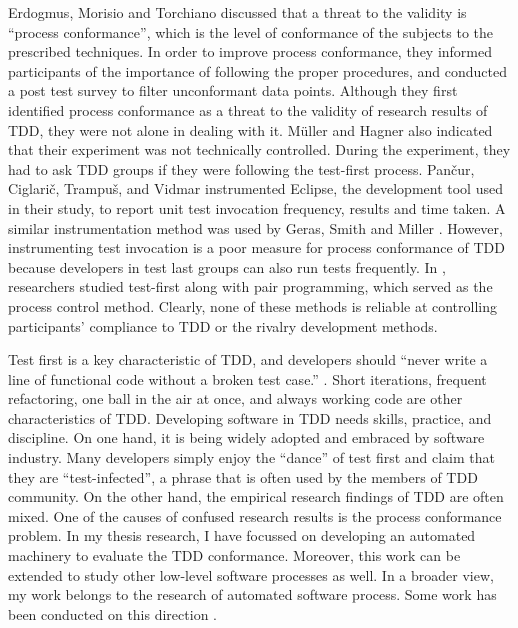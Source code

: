 Erdogmus, Morisio and Torchiano \cite{Erdogmus:05} discussed that
a threat to the validity is ``process conformance'',
which is the level of conformance of the subjects
to the prescribed techniques. In order to improve process conformance,
they informed participants of the importance of following the 
proper procedures, and conducted a post test survey to filter 
unconformant data points\cite{Erdogmus:05}. Although they first
identified process conformance as a threat to the validity 
of research results of TDD, they were not alone in 
dealing with it. M\"uller and Hagner \cite{Muller:02} also 
indicated that their experiment was not technically controlled. 
During the experiment, they had to ask TDD groups if they were
following the test-first process. Pan\v{c}ur, Ciglari\v{c}, 
Trampu\v{s}, and Vidmar \cite{Matjaz:03} instrumented Eclipse, 
the development tool used in their study, to report unit test 
invocation frequency, results and time taken. A similar 
instrumentation method was used by Geras, Smith and Miller 
\cite{Geras:04}. However, instrumenting test invocation is 
a poor measure for process conformance of TDD because developers 
in test last groups can also run tests frequently. In 
\cite{George:03,Williams:03,Maximilien:03}, researchers studied 
test-first along with pair programming, which served as the 
process control method. Clearly, none of these methods is 
reliable at controlling participants' compliance to TDD or 
the rivalry development methods. 

Test first is a key characteristic of TDD, and developers 
should ``never write a line of functional code without a broken 
test case.'' \cite{Beck:01}. Short iterations, frequent 
refactoring, one ball in the air at once, and always working 
code are other characteristics of TDD. Developing software in 
TDD needs skills, practice, and discipline. On one hand, it is 
being widely adopted and embraced by software industry. Many 
developers simply enjoy the ``dance'' of test first and claim that
they are ``test-infected'', a phrase that is often used by the 
members of TDD community. On the other hand, the empirical research 
findings of TDD are often mixed. One of the causes of 
confused research results is the process conformance problem. 
In my thesis research, I have focussed on developing an automated 
machinery to evaluate the TDD conformance. Moreover, this work 
can be extended to study other low-level software processes as 
well. In a broader view, my work belongs to the research of automated 
software process. Some work has been conducted on this 
direction \cite{Cook:95,Cook:96,Jensen:04,Jensen:05}.

